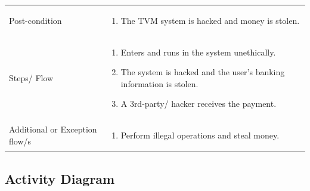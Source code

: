 \documentclass[15pt]{article}
\begin{document}
\begin{enumerate}[leftmargin=2em, itemsep=0pt, parsep=0pt, , font=\Large\bfseries]
\begin{tabularx}{1\textwidth} { 
  | >{\raggedright\arraybackslash}X 
  | >{\raggedright\arraybackslash}X 
  | }
   Post-condition  & \begin{enumerate}
  \item The TVM system is hacked and money is stolen. 
  \end{enumerate}
  \\
  
  Steps/ Flow  & \begin{enumerate}
  \item Enters and runs in the system unethically.
  \item The system is hacked and the user’s banking information is stolen.
  \item A 3rd-party/ hacker receives the payment.
  \end{enumerate}
  \\
  
   Additional or Exception flow/s  & \begin{enumerate}
  \item  Perform illegal operations and steal money.
  \end{enumerate}
  \\

\hline
\end{tabularx}
\end{enumerate}

\subsection{\Large{Activity Diagram}}
\end{document}
